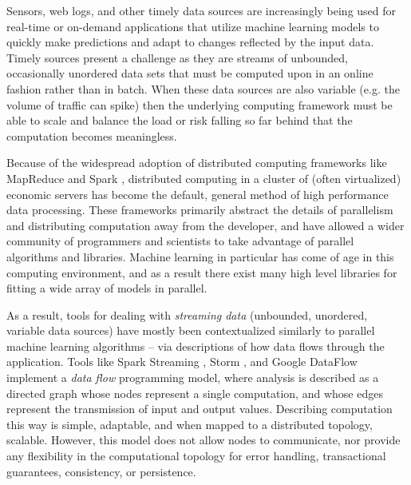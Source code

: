 \documentclass[conference,twocolumn,11pt]{IEEEtran}
\begin{document}
Sensors, web logs, and other timely data sources are increasingly being used for  real-time or on-demand applications that utilize machine learning models to quickly make predictions and adapt to changes reflected by the input data. Timely sources present a challenge as they are streams of unbounded, occasionally unordered data sets that must be computed upon in an online fashion rather than in batch. When these data sources are also variable (e.g. the volume of traffic can spike) then the underlying computing framework must be able to scale and balance the load or risk falling so far behind that the computation becomes meaningless.

Because of the widespread adoption of distributed computing frameworks like MapReduce \cite{dean_mapreduce:_2008} and Spark \cite{zaharia_resilient_2012}, distributed computing in a cluster of (often virtualized) economic servers has become the default, general method of high performance data processing. These frameworks primarily abstract the details of parallelism and distributing computation away from the developer, and have allowed a wider community of programmers and scientists to take advantage of parallel algorithms and libraries. Machine learning in particular has come of age in this computing environment, and as a result there exist many high level libraries for fitting a wide array of models in parallel.

As a result, tools for dealing with \textit{streaming data} (unbounded, unordered, variable data sources) have mostly been contextualized similarly to parallel machine learning algorithms -- via descriptions of how data flows through the application. Tools like Spark Streaming \cite{zaharia_discretized_2012}, Storm \cite{toshniwal_storm_2014}, and Google DataFlow \cite{akidau_dataflow_2015} implement a \textit{data flow} programming model, where analysis is described as a directed graph whose nodes represent a single computation, and whose edges represent the transmission of input and output values. Describing computation this way is simple, adaptable, and when mapped to a distributed topology, scalable. However, this model does not allow nodes to communicate, nor provide any flexibility in the computational topology for error handling, transactional guarantees, consistency, or persistence.
\end{document}
